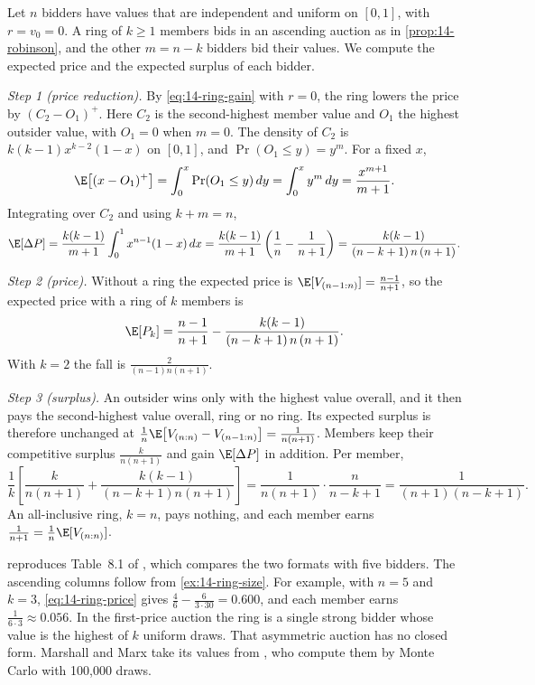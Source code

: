 \begin{example}\label{ex:14-ring-size}
Let $n$ bidders have values that are independent and uniform on $[0,1]$, with $r=v_0=0$. A ring of
$k\ge 1$ members bids in an ascending auction as in \cref{prop:14-robinson}, and the other $m=n-k$
bidders bid their values. We compute the expected price and the expected surplus of each bidder.

\emph{Step 1 (price reduction).} By \eqref{eq:14-ring-gain} with $r=0$, the ring lowers the price by
$(C_2-O_1)^+$. Here $C_2$ is the second-highest member value and $O_1$ the highest outsider value, with
$O_1=0$ when $m=0$. The density of $C_2$ is $k(k-1)x^{k-2}(1-x)$ on $[0,1]$, and $\Pr(O_1\le y)=y^m$.
For a fixed $x$,
\[
\E\bigl[(x-O_1)^+\bigr]=\int_0^x\Pr(O_1\le y)\,dy=\int_0^x y^m\,dy=\frac{x^{m+1}}{m+1}.
\]
Integrating over $C_2$ and using $k+m=n$,
\[
\E[\Delta P]=\frac{k(k-1)}{m+1}\int_0^1x^{n-1}(1-x)\,dx
=\frac{k(k-1)}{m+1}\left(\frac{1}{n}-\frac{1}{n+1}\right)
=\frac{k(k-1)}{(n-k+1)\,n\,(n+1)}.
\]

\emph{Step 2 (price).} Without a ring the expected price is $\E[V_{(n-1:n)}]=\frac{n-1}{n+1}$, so the
expected price with a ring of $k$ members is
\begin{equation}\label{eq:14-ring-price}
\E[P_k]=\frac{n-1}{n+1}-\frac{k(k-1)}{(n-k+1)\,n\,(n+1)}.
\end{equation}
With $k=2$ the fall is $\frac{2}{(n-1)n(n+1)}$.

\emph{Step 3 (surplus).} An outsider wins only with the highest value overall, and it then pays the
second-highest value overall, ring or no ring. Its expected surplus is therefore unchanged at
$\frac{1}{n}\E\bigl[V_{(n:n)}-V_{(n-1:n)}\bigr]=\frac{1}{n(n+1)}$. Members keep their competitive surplus
$\frac{k}{n(n+1)}$ and gain $\E[\Delta P]$ in addition. Per member,
\[
\frac{1}{k}\left[\frac{k}{n(n+1)}+\frac{k(k-1)}{(n-k+1)n(n+1)}\right]
=\frac{1}{n(n+1)}\cdot\frac{n}{n-k+1}
=\frac{1}{(n+1)(n-k+1)}.
\]
An all-inclusive ring, $k=n$, pays nothing, and each member earns $\frac{1}{n+1}=\frac{1}{n}\E[V_{(n:n)}]$.
\end{example}

 reproduces Table~8.1 of \citet[ch.~8, p.~182]{MarshallMarx2012}, which compares
the two formats with five bidders. The ascending columns follow from \cref{ex:14-ring-size}. For
example, with $n=5$ and $k=3$, \eqref{eq:14-ring-price} gives $\frac{4}{6}-\frac{6}{3\cdot 30}=0.600$, and
each member earns $\frac{1}{6\cdot 3}\approx 0.056$. In the first-price auction the ring is a single
strong bidder whose value is the highest of $k$ uniform draws. That asymmetric auction has no closed
form. Marshall and Marx take its values from \citet[Table~III]{MarshallEtAl1994}, who compute them by
Monte Carlo with 100,000 draws.

